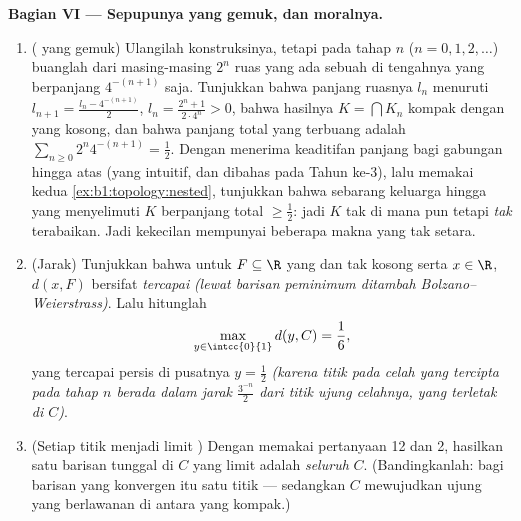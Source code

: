 \begin{problem}[{Soal akhir pekan --- \omterm{pb:b1:topology:1}{himpunan Cantor} sepertiga
tengah: panjang nol, takterbilang, sempurna, dan $C + C =
\intcc{0}{2}$}]
\medskip
\noindent\textbf{Bagian VI --- Sepupunya yang gemuk, dan moralnya.}
\begin{enumerate}[resume]
  \item ( yang gemuk) Ulangilah konstruksinya, tetapi pada tahap
        $n$ ($n = 0, 1, 2, \dots$) buanglah dari masing-masing $2^n$
        ruas yang ada sebuah   di tengahnya yang berpanjang
        $4^{-(n+1)}$ saja. Tunjukkan bahwa panjang ruasnya $l_n$
        menuruti $l_{n+1} = \frac{l_n - 4^{-(n+1)}}{2}$, $l_n =
        \frac{2^n + 1}{2\cdot 4^n} > 0$, bahwa hasilnya
        $K = \bigcap K_n$ kompak dengan  yang kosong, dan
        bahwa panjang total yang terbuang adalah $\sum_{n\geq0} 2^n
        4^{-(n+1)} = \frac12$. Dengan menerima keaditifan panjang bagi
        gabungan hingga atas  (yang intuitif, dan dibahas pada Tahun ke-3), lalu
        memakai kedua  \cref{ex:b1:topology:nested},
        tunjukkan bahwa sebarang keluarga hingga   yang menyelimuti
        $K$ berpanjang total $\geq \frac12$: jadi $K$ tak 
        di mana pun tetapi \emph{tak} terabaikan. Jadi kekecilan mempunyai beberapa
        makna yang tak setara.
  \item (Jarak) Tunjukkan bahwa untuk $F \subseteq \R$ yang  dan tak kosong
        serta $x \in \R$,  $d(x, F)$ bersifat
        \emph{tercapai} \emph{(lewat barisan peminimum ditambah
        Bolzano--Weierstrass)}. Lalu hitunglah
        \[
        \max_{y \in \intcc{0}{1}} d(y, C) = \frac16 ,
        \]
        yang tercapai persis di pusatnya $y = \frac12$ \emph{(karena
        titik pada celah yang tercipta pada tahap $n$ berada dalam jarak
        $\frac{3^{-n}}{2}$ dari titik ujung celahnya, yang terletak di
        $C$)}.
  \item (Setiap titik menjadi limit ) Dengan memakai pertanyaan 12
        dan 2, hasilkan satu barisan tunggal di $C$ yang 
        limit  adalah \emph{seluruh} $C$. (Bandingkanlah:
        bagi barisan yang konvergen  itu satu titik ---
        sedangkan $C$ mewujudkan ujung yang berlawanan di antara yang kompak.)

\end{enumerate}
\end{problem}
